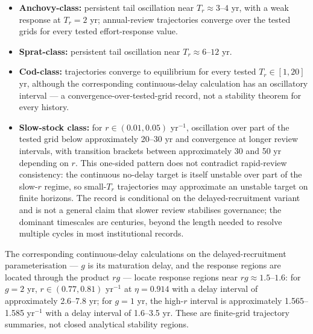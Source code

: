 \documentclass[11pt]{article}
\providecommand{\tightlist}{\setlength{\itemsep}{0pt}\setlength{\parskip}{0pt}}
\begin{document}
\begin{itemize}
\tightlist
\item
  \textbf{Anchovy-class:} persistent tail oscillation near
  \(T_r\approx 3\)--\(4\) yr, with a weak response at \(T_r=2\) yr;
  annual-review trajectories converge over the tested grids for every
  tested effort-response value.
\item
  \textbf{Sprat-class:} persistent tail oscillation near
  \(T_r\approx 6\)--\(12\) yr.
\item
  \textbf{Cod-class:} trajectories converge to equilibrium for every
  tested \(T_r\in[1,20]\) yr, although the corresponding
  continuous-delay calculation has an oscillatory interval --- a
  convergence-over-tested-grid record, not a stability theorem for every
  history.
\item
  \textbf{Slow-stock class:} for \(r\in(0.01,0.05)\) yr\(^{-1}\),
  oscillation over part of the tested grid below approximately 20--30 yr
  and convergence at longer review intervals, with transition brackets
  between approximately 30 and 50 yr depending on \(r\). This one-sided
  pattern does not contradict rapid-review consistency: the continuous
  no-delay target is itself unstable over part of the slow-\(r\) regime,
  so small-\(T_r\) trajectories may approximate an unstable target on
  finite horizons. The record is conditional on the delayed-recruitment
  variant and is not a general claim that slower review stabilises
  governance; the dominant timescales are centuries, beyond the length
  needed to resolve multiple cycles in most institutional records.
\end{itemize}

The corresponding continuous-delay calculations on the
delayed-recruitment parameterisation --- \(g\) is its maturation delay,
and the response regions are located through the product \(rg\) ---
locate response regions near \(rg\approx 1.5\)--\(1.6\): for \(g=2\) yr,
\(r\in(0.77,0.81)\) yr\(^{-1}\) at \(\eta=0.914\) with a delay interval
of approximately 2.6--7.8 yr; for \(g=1\) yr, the high-\(r\) interval is
approximately 1.565--1.585 yr\(^{-1}\) with a delay interval of 1.6--3.5
yr. These are finite-grid trajectory summaries, not closed analytical
stability regions.
\end{document}
